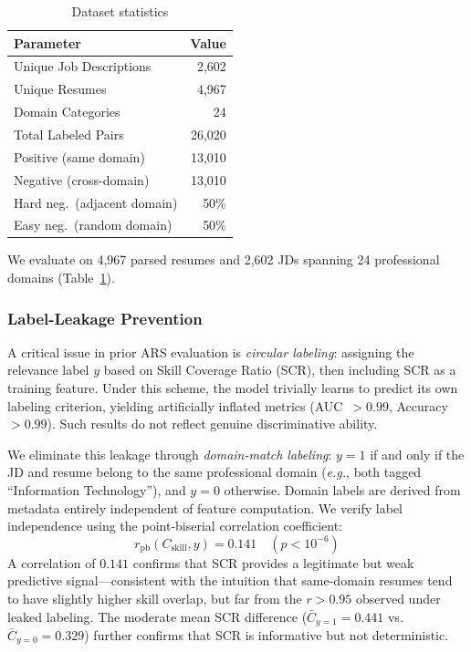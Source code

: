 \documentclass{svproc}
\begin{document}
\begin{table}[t]
\centering
\caption{Dataset statistics}
\label{tab:dataset}
\begin{tabular}{lr}
\toprule
Parameter & Value \\
\midrule
Unique Job Descriptions & 2,602 \\
Unique Resumes & 4,967 \\
Domain Categories & 24 \\
Total Labeled Pairs & 26,020 \\
Positive (same domain) & 13,010 \\
Negative (cross-domain) & 13,010 \\
\quad Hard neg.\ (adjacent domain) & 50\% \\
\quad Easy neg.\ (random domain) & 50\% \\
\bottomrule
\end{tabular}
\end{table}

We evaluate on 4,967 parsed resumes and 2,602 JDs spanning 24 professional domains (Table~\ref{tab:dataset}).

\subsubsection{Label-Leakage Prevention}
A critical issue in prior ARS evaluation is \textit{circular labeling}: assigning the relevance label $y$ based on Skill Coverage Ratio (SCR), then including SCR as a training feature. Under this scheme, the model trivially learns to predict its own labeling criterion, yielding artificially inflated metrics (AUC~$> 0.99$, Accuracy~$> 0.99$). Such results do not reflect genuine discriminative ability.

We eliminate this leakage through \textit{domain-match labeling}: $y{=}1$ if and only if the JD and resume belong to the same professional domain (\textit{e.g.}, both tagged ``Information Technology''), and $y{=}0$ otherwise. Domain labels are derived from metadata entirely independent of feature computation. We verify label independence using the point-biserial correlation coefficient:
\begin{equation}
    r_{\mathrm{pb}}(C_{\mathrm{skill}}, y) = 0.141 \quad (p < 10^{-6})
\end{equation}
A correlation of $0.141$ confirms that SCR provides a legitimate but weak predictive signal---consistent with the intuition that same-domain resumes tend to have slightly higher skill overlap, but far from the $r > 0.95$ observed under leaked labeling. The moderate mean SCR difference ($\bar{C}_{y=1} = 0.441$ vs.\ $\bar{C}_{y=0} = 0.329$) further confirms that SCR is informative but not deterministic.
\end{document}
